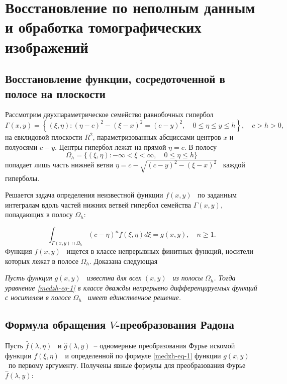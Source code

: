 \chapter{Восстановление по неполным данным и обработка томографических изображений}


\section{Восстановление функции, сосредоточенной в полосе на плоскости}

Рассмотрим двухпараметрическое семейство равнобочных гипербол
\begin{equation*}
\Gamma \left(x,y\right)=\left\{\left(\xi ,\eta \right):\left(\eta -c\right)^2-(\xi -x)^2=(c-y)^2,\quad 0{\leq}\eta
{\leq}y{\leq}h\right\},\quad c>h>0,
\end{equation*}
на евклидовой плоскости  $R^2$, параметризованных абсциссами центров  $x$ и полуосями  $c-y$. Центры гипербол лежат на
прямой  $\eta =c$. В полосу
\begin{equation*}
\Omega _h=\{\left(\xi ,\eta \right):-{\infty}<\xi <{\infty},\quad 0{\leq}\eta {\leq}h\}
\end{equation*}
попадает лишь часть нижней ветви  $\eta =c-\sqrt{\left(c-y\right)^2-\left(\xi -x\right)^2}$ \ каждой гиперболы.

Решается задача определения неизвестной функции  $f(x,y)$ \ по заданным интегралам вдоль частей нижних ветвей гипербол
семейства  $\Gamma \left(x,y\right)$, попадающих в полосу  $\Omega _h$:

\begin{equation}\label{medzh-eq-1}
\int _{\Gamma \left(x,y\right){\cap}\Omega _h}^{}\left(c-\eta \right)^nf\left(\xi ,\eta \right)\mathit{d\xi
}=g\left(x,y\right),\quad n{\geq}1.
\end{equation}
Функция  $f(x,y)$ \ ищется в классе непрерывных финитных функций, носители которых лежат в полосе  $\Omega _h$. 
Доказана следующая

\begin{theorem}
\textit{Пусть функция } $g\left(x,y\right)$ \textit{\ известна для всех } $\left(x,y\right)$
\textit{\ из полосы } $\Omega _h$\textit{. Тогда уравнение \eqref{medzh-eq-1} в классе дважды непрерывно дифференцируемых функций с
	носителем в полосе } $\Omega _h$ \textit{\ имеет единственное решение.}
\end{theorem}


\section{Формула обращения $V$-преобразования Радона}
Пусть  $\widehat  f(\lambda ,\eta )$ \ и  $\widehat  g\left(\lambda ,y\right)$\ – одномерные преобразования Фурье
искомой функции  $f(\xi ,\eta )$ \ и определенной по формуле \eqref{medzh-eq-1} функции  $g(x,y)$ \ по первому аргументу. Получены
явные формулы для преобразования Фурье  $\widehat  f\left(\lambda ,y\right)$:



